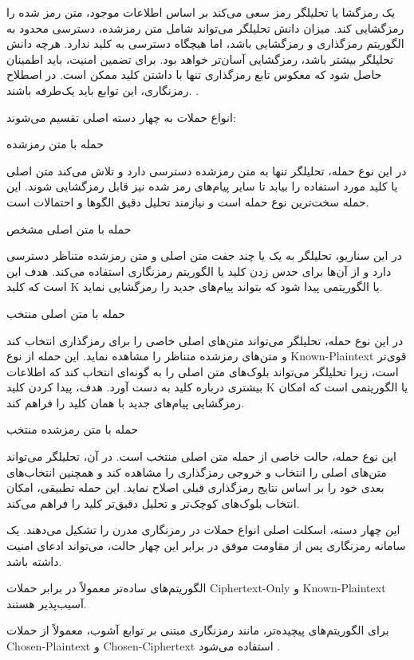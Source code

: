 یک رمزگشا یا تحلیلگر رمز سعی می‌کند بر اساس اطلاعات موجود، متن رمز شده را رمزگشایی کند. میزان دانش تحلیلگر می‌تواند شامل متن رمزشده، دسترسی محدود به الگوریتم رمزگذاری و رمزگشایی باشد، اما هیچگاه دسترسی به کلید ندارد. هرچه دانش تحلیلگر بیشتر باشد، رمزگشایی آسان‌تر خواهد بود. برای تضمین امنیت، باید اطمینان حاصل شود که معکوس تابع رمزگذاری تنها با داشتن کلید ممکن است. در اصطلاح رمزنگاری، این توابع باید یک‌طرفه باشند. \cite{ref33}.

انواع حملات به چهار دسته اصلی تقسیم می‌شوند\cite{ref34}:

حمله با متن رمزشده

در این نوع حمله، تحلیلگر تنها به متن رمزشده دسترسی دارد و تلاش می‌کند متن اصلی یا کلید مورد استفاده را بیابد تا سایر پیام‌های رمز شده نیز قابل رمزگشایی شوند. این حمله سخت‌ترین نوع حمله است و نیازمند تحلیل دقیق الگوها و احتمالات است.

حمله با متن اصلی مشخص

در این سناریو، تحلیلگر به یک یا چند جفت متن اصلی و متن رمزشده متناظر دسترسی دارد و از آن‌ها برای حدس زدن کلید یا الگوریتم رمزنگاری استفاده می‌کند. هدف این است که کلید ‎K‎ یا الگوریتمی پیدا شود که بتواند پیام‌های جدید را رمزگشایی نماید.

حمله با متن اصلی منتخب

در این نوع حمله، تحلیلگر می‌تواند متن‌های اصلی خاصی را برای رمزگذاری انتخاب کند و متن‌های رمزشده متناظر را مشاهده نماید. این حمله از نوع ‎Known-Plaintext‎ قوی‌تر است، زیرا تحلیلگر می‌تواند بلوک‌های متن اصلی را به گونه‌ای انتخاب کند که اطلاعات بیشتری درباره کلید به دست آورد. هدف، پیدا کردن کلید ‎K‎ یا الگوریتمی است که امکان رمزگشایی پیام‌های جدید با همان کلید را فراهم کند.

حمله با متن رمزشده منتخب

این نوع حمله، حالت خاصی از حمله متن اصلی منتخب است. در آن، تحلیلگر می‌تواند متن‌های اصلی را انتخاب و خروجی رمزگذاری را مشاهده کند و همچنین انتخاب‌های بعدی خود را بر اساس نتایج رمزگذاری قبلی اصلاح نماید. این حمله تطبیقی، امکان انتخاب بلوک‌های کوچک‌تر و تحلیل دقیق‌تر کلید را فراهم می‌کند.

این چهار دسته، اسکلت اصلی انواع حملات در رمزنگاری مدرن را تشکیل می‌دهند. یک سامانه رمزنگاری پس از مقاومت موفق در برابر این چهار حالت، می‌تواند ادعای امنیت داشته باشد.

الگوریتم‌های ساده‌تر معمولاً در برابر حملات ‎Ciphertext-Only‎ و ‎Known-Plaintext‎ آسیب‌پذیر هستند.

برای الگوریتم‌های پیچیده‌تر، مانند رمزنگاری مبتنی بر توابع آشوب، معمولاً از حملات ‎Chosen-Plaintext‎ و ‎Chosen-Ciphertext‎ استفاده می‌شود \cite{ref35}.

